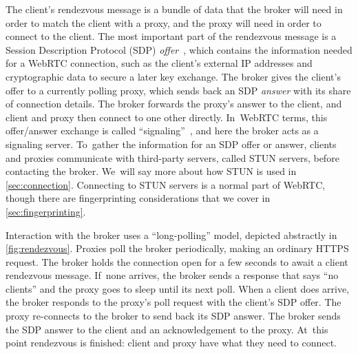 \documentclass[letterpaper,twocolumn]{article}
\newcommand{\firstterm}[1]{\textit{#1}}
\begin{document}
The client's rendezvous message
is a bundle of data that the broker will need in order to match the client with a proxy,
and the proxy will need in order to connect to the client.
The most important part of the rendezvous message is a
Session Description Protocol (SDP) \firstterm{offer}~\cite{rfc8839},
which contains the information needed for a WebRTC connection,
such as the client's external IP addresses
and cryptographic data to secure a later key exchange.
The broker gives the client's offer to a currently polling proxy,
which sends back an SDP \firstterm{answer}
with its share of connection details.
The broker forwards the proxy's answer to the client,
and client and proxy then connect to one other directly.
In~WebRTC terms, this offer/\allowbreak answer exchange is called
``signaling''~\cite[\S 2.2]{rfc8825}, and here the broker acts as a signaling server.
To~gather the information for an SDP offer or answer,
clients and proxies communicate with third-party servers,
called STUN servers,
before contacting the broker.
We~will say more about how STUN is used in \autoref{sec:connection}.
Connecting to STUN servers is a normal part of WebRTC,
though there are fingerprinting considerations
that we cover in \autoref{sec:fingerprinting}.

Interaction with the broker uses a ``long-polling'' model,
depicted abstractly in \autoref{fig:rendezvous}.
Proxies poll the broker periodically,
making an ordinary HTTPS request.
The broker holds the connection open for a few seconds
to await a client rendezvous message.
If~none arrives, the broker sends a response that says ``no clients''
and the proxy goes to sleep until its next poll.
When a client does arrive,
the broker responds to the proxy's poll request
with the client's SDP offer.
The proxy re-connects to the broker to send back its SDP answer.
The broker sends the SDP answer to the client
and an acknowledgement to the proxy.
At~this point rendezvous is finished:
client and proxy have what they need to connect.
\end{document}
